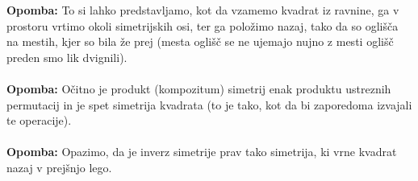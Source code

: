\documentclass[a4paper]{article}
\newcounter{environment:definition_counter}
\newcounter{environment:theorem_counter}
\newcounter{environment:statement_counter}
\newenvironment{remark}
{\textbf{Opomba:}}
{}
\begin{document}
\begin{remark}
To si lahko predstavljamo, kot da vzamemo kvadrat iz ravnine, ga v prostoru vrtimo okoli simetrijskih osi, ter ga položimo nazaj, tako da so oglišča na mestih, kjer so bila že prej (mesta oglišč se ne ujemajo nujno z mesti oglišč preden smo lik dvignili).
\end{remark}
\\
\\
\begin{remark}
Očitno je produkt (kompozitum) simetrij enak produktu ustreznih permutacij in je spet simetrija kvadrata (to je tako, kot da bi zaporedoma izvajali te operacije).
\end{remark}
\\
\\
\begin{remark}
Opazimo, da je inverz simetrije prav tako simetrija, ki vrne kvadrat nazaj v prejšnjo lego.
\end{remark}
\\
\\
\end{document}
